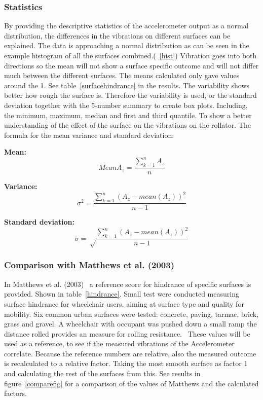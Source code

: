 \subsubsection{Statistics}
By providing the descriptive statistics of the accelerometer output as a normal distribution, the differences in the vibrations on different surfaces can be explained. The data is approaching a normal distribution as can be seen in the example histogram of all the surfaces combined.(~\ref{hist}) Vibration goes into both directions so the mean will not show a surface specific outcome and will not differ much between the different surfaces. The means calculated only gave values around the 1. See table~\ref{surfacehindrance} in the results. The variability shows better how rough the surface is. Therefore the variability is used, or the standard deviation together with the 5-number summary to create box plots. Including, the minimum, maximum, median and first and third quantile. To show a better understanding of the effect of the surface on the vibrations on the rollator. The formula for the mean variance and standard deviation:

\textbf{Mean:} 
\begin{equation}
Mean A_{z} = \frac{\sum_{k=1}^n A_{z}}{n}
\end{equation}

\textbf{Variance:}
\begin{equation}
\sigma^2 = \frac{\sum_{k=1}^n (A_{z}- mean(A_{z}))^2}{n-1}
\end{equation}

\textbf{Standard deviation:}
\begin{equation}
\sigma = \sqrt \frac{\sum_{k=1}^n (A_{z}- mean(A_{z}))^2}{n-1}
\end{equation}

\subsubsection{Comparison with Matthews et al. (2003)}
In Matthews et al. (2003)~\cite{Matthews2003} a reference score for hindrance of specific surfaces is provided. Shown in table~\ref{hindrance}.
Small test were conducted measuring surface hindrance for wheelchair users, aiming at surface type and quality for mobility. Six common urban surfaces were tested: concrete, paving, tarmac, brick, grass and gravel. A wheelchair with occupant was pushed down a small ramp the distance rolled provides an measure for rolling resistance.~\cite{Matthews2003}
These values will be used as a reference, to see if the measured vibrations of the Accelerometer correlate. Because the reference numbers are relative, also the measured outcome is recalculated to a relative factor. Taking the most smooth surface as factor 1 and calculating the rest of the surfaces from this. See results in figure~\ref{comparefig} for a comparison of the values of Matthews and the calculated factors. 

